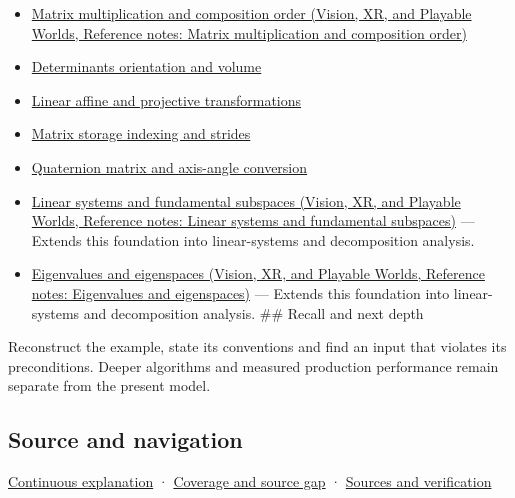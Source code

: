 \hypertarget{appendix-bd39c3bf5d64-used-by}{}

\begin{itemize}
\tightlist
\item
  \href{../07-Vision-XR-and-Playable-Worlds/main.pdf\#nameddest=appendix-ab31ef447dbf}{Matrix multiplication and composition order (Vision, XR, and Playable Worlds, Reference notes: Matrix multiplication and composition order)}
\item
  \hyperref[appendix-da478be01d02]{Determinants orientation and volume}
\item
  \hyperref[appendix-0bf0ca73f735]{Linear affine and projective transformations}
\item
  \hyperref[appendix-ffdc1d4e5350]{Matrix storage indexing and strides}
\item
  \hyperref[appendix-26d8da71f6c4]{Quaternion matrix and axis-angle conversion}
\item
  \href{../07-Vision-XR-and-Playable-Worlds/main.pdf\#nameddest=appendix-8572a4a060c1}{Linear systems and fundamental subspaces (Vision, XR, and Playable Worlds, Reference notes: Linear systems and fundamental subspaces)} --- Extends this foundation into linear-systems and decomposition analysis.
\item
  \href{../07-Vision-XR-and-Playable-Worlds/main.pdf\#nameddest=appendix-0b3be18411f9}{Eigenvalues and eigenspaces (Vision, XR, and Playable Worlds, Reference notes: Eigenvalues and eigenspaces)} --- Extends this foundation into linear-systems and decomposition analysis. \#\# Recall and next depth
\end{itemize}

Reconstruct the example, state its conventions and find an input that violates its preconditions. Deeper algorithms and measured production performance remain separate from the present model.

\subsection{Source and navigation}\label{appendix-bd39c3bf5d64-source-and-navigation}

\hypertarget{appendix-bd39c3bf5d64-source-and-navigation}{}

\hyperref[01-foundations-i-ch018-keep-the-promises-visible-while-moving-between-representations]{Continuous explanation} · \hyperref[appendix-fd090d982a15-phase-7---parts-601-700]{Coverage and source gap} · \hyperref[appendix-a103e7846d21-phase-7---source-analysis-and-verification]{Sources and verification}
